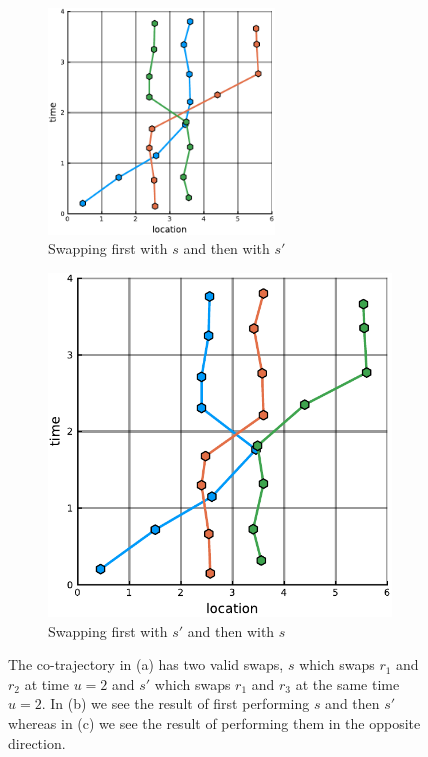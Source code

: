 \documentclass[12pt]{article}
\newcommand{\traj}{r}
\newcommand{\swap}{s}
\newcommand{\swaptime}{u}
\theoremstyle{definition}
\begin{document}
\begin{figure}
    \begin{subfigure}[t]{0.45\textwidth}
      \includegraphics[width=6cm]{swaporder_counterexample-b.pdf}
      \caption{Swapping first with \(\swap\) and then with \(\swap'\)}
      \label{fig:swap-order-counter-example-b}
    \end{subfigure}
    \begin{subfigure}[t]{0.45\textwidth}
      \includegraphics[width=\textwidth]{swaporder_counterexample-c.pdf}
      \caption{Swapping first with \(\swap'\) and then with \(\swap\)}
      \label{fig:swap-order-counter-example-c}
    \end{subfigure}
    \caption{The co-trajectory in (a) has two valid swaps, \(\swap\)
      which swaps \(\traj_{1}\) and \(\traj_{2}\) at time
      \(\swaptime = 2\) and \(\swap'\) which swaps \(\traj_{1}\) and
      \(\traj_{3}\) at the same time \(\swaptime = 2\). In (b) we see
      the result of first performing \(\swap\) and then \(\swap'\)
      whereas in (c) we see the result of performing them in the
      opposite direction.}
    \label{fig:swap-order-counter-example}
\end{figure}
\end{document}
